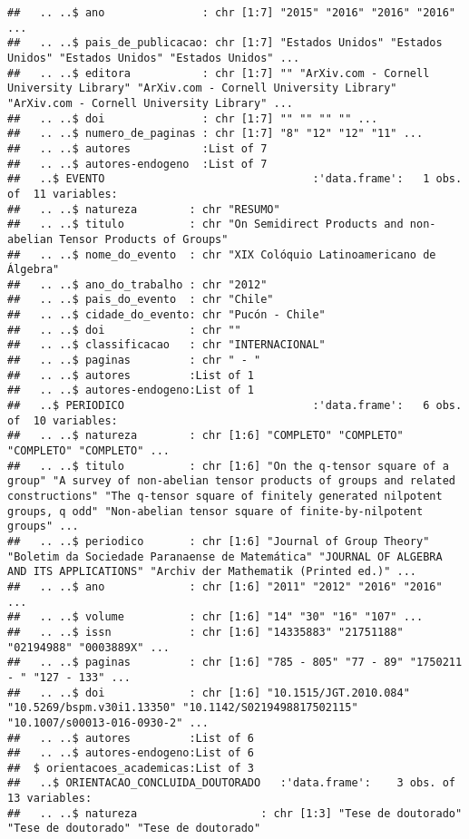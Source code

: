 \documentclass[]{article}
\begin{document}
\begin{verbatim}
##   .. ..$ ano               : chr [1:7] "2015" "2016" "2016" "2016" ...
##   .. ..$ pais_de_publicacao: chr [1:7] "Estados Unidos" "Estados Unidos" "Estados Unidos" "Estados Unidos" ...
##   .. ..$ editora           : chr [1:7] "" "ArXiv.com - Cornell University Library" "ArXiv.com - Cornell University Library" "ArXiv.com - Cornell University Library" ...
##   .. ..$ doi               : chr [1:7] "" "" "" "" ...
##   .. ..$ numero_de_paginas : chr [1:7] "8" "12" "12" "11" ...
##   .. ..$ autores           :List of 7
##   .. ..$ autores-endogeno  :List of 7
##   ..$ EVENTO                                :'data.frame':   1 obs. of  11 variables:
##   .. ..$ natureza        : chr "RESUMO"
##   .. ..$ titulo          : chr "On Semidirect Products and non-abelian Tensor Products of Groups"
##   .. ..$ nome_do_evento  : chr "XIX Colóquio Latinoamericano de Álgebra"
##   .. ..$ ano_do_trabalho : chr "2012"
##   .. ..$ pais_do_evento  : chr "Chile"
##   .. ..$ cidade_do_evento: chr "Pucón - Chile"
##   .. ..$ doi             : chr ""
##   .. ..$ classificacao   : chr "INTERNACIONAL"
##   .. ..$ paginas         : chr " - "
##   .. ..$ autores         :List of 1
##   .. ..$ autores-endogeno:List of 1
##   ..$ PERIODICO                             :'data.frame':   6 obs. of  10 variables:
##   .. ..$ natureza        : chr [1:6] "COMPLETO" "COMPLETO" "COMPLETO" "COMPLETO" ...
##   .. ..$ titulo          : chr [1:6] "On the q-tensor square of a group" "A survey of non-abelian tensor products of groups and related constructions" "The q-tensor square of finitely generated nilpotent groups, q odd" "Non-abelian tensor square of finite-by-nilpotent groups" ...
##   .. ..$ periodico       : chr [1:6] "Journal of Group Theory" "Boletim da Sociedade Paranaense de Matemática" "JOURNAL OF ALGEBRA AND ITS APPLICATIONS" "Archiv der Mathematik (Printed ed.)" ...
##   .. ..$ ano             : chr [1:6] "2011" "2012" "2016" "2016" ...
##   .. ..$ volume          : chr [1:6] "14" "30" "16" "107" ...
##   .. ..$ issn            : chr [1:6] "14335883" "21751188" "02194988" "0003889X" ...
##   .. ..$ paginas         : chr [1:6] "785 - 805" "77 - 89" "1750211 - " "127 - 133" ...
##   .. ..$ doi             : chr [1:6] "10.1515/JGT.2010.084" "10.5269/bspm.v30i1.13350" "10.1142/S0219498817502115" "10.1007/s00013-016-0930-2" ...
##   .. ..$ autores         :List of 6
##   .. ..$ autores-endogeno:List of 6
##  $ orientacoes_academicas:List of 3
##   ..$ ORIENTACAO_CONCLUIDA_DOUTORADO   :'data.frame':    3 obs. of  13 variables:
##   .. ..$ natureza                   : chr [1:3] "Tese de doutorado" "Tese de doutorado" "Tese de doutorado"

\end{verbatim}
\end{document}

